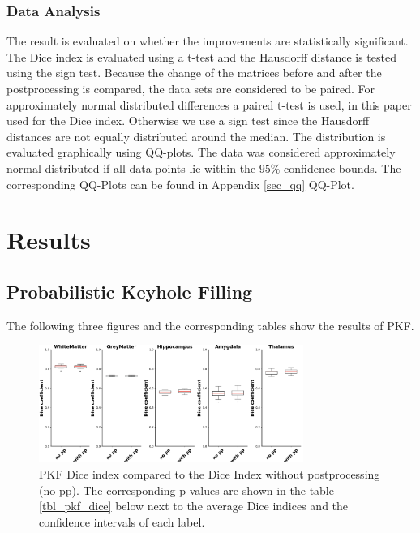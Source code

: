 \documentclass[journal]{IEEEtran}
\begin{document}
\subsubsection{Data Analysis}
The result is evaluated on whether the improvements are statistically significant. The Dice index is evaluated using a t-test and the Hausdorff distance is tested using the sign test. 
Because the change of the matrices before and after the postprocessing is compared, the data sets are considered to be paired. For approximately normal distributed differences a paired t-test is used, in this paper used for the Dice index. Otherwise we use a sign test since the Hausdorff distances are not equally distributed around the median. The distribution is evaluated graphically using QQ-plots. The data was considered approximately normal distributed if all data points lie within the $95\%$ confidence bounds. The corresponding QQ-Plots can be found in Appendix \ref{sec_qq} QQ-Plot.

\section{Results}

\newcommand{\expnumber}[2]{{#1}\mathrm{e}{#2}}
\subsection{Probabilistic Keyhole Filling}
The following three figures and the corresponding tables show the results of PKF.

\begin{figure}[ht]
\centering
\includegraphics[width=3.4in]{MIALab_Report/img/boxplots/PKF-Dice.png}
\caption{PKF Dice index compared to the Dice Index without postprocessing (no pp). The corresponding p-values are shown in the table \ref{tbl_pkf_dice} below next to the average Dice indices and the confidence intervals of each label.}
\label{fig_pkf_dice}
\end{figure}
\end{document}
